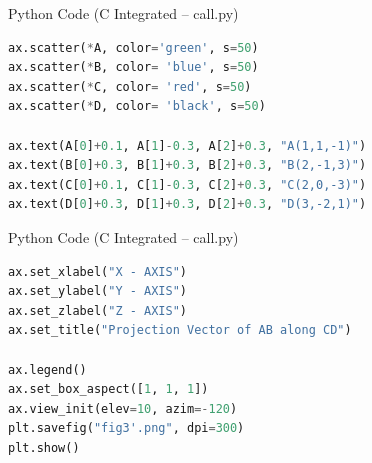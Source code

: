 \documentclass{beamer}
\begin{document}
\begin{frame}[fragile]{Python Code (C Integrated – call.py)
}
\begin{lstlisting}[language=Python]
ax.scatter(*A, color='green', s=50)
ax.scatter(*B, color= 'blue', s=50)
ax.scatter(*C, color= 'red', s=50)
ax.scatter(*D, color= 'black', s=50)

ax.text(A[0]+0.1, A[1]-0.3, A[2]+0.3, "A(1,1,-1)")
ax.text(B[0]+0.3, B[1]+0.3, B[2]+0.3, "B(2,-1,3)")
ax.text(C[0]+0.1, C[1]-0.3, C[2]+0.3, "C(2,0,-3)")
ax.text(D[0]+0.3, D[1]+0.3, D[2]+0.3, "D(3,-2,1)")
\end{lstlisting}
\end{frame}

\begin{frame}[fragile]{Python Code (C Integrated – call.py)
}
\begin{lstlisting}[language=Python]
ax.set_xlabel("X - AXIS")
ax.set_ylabel("Y - AXIS")
ax.set_zlabel("Z - AXIS")
ax.set_title("Projection Vector of AB along CD")

ax.legend()
ax.set_box_aspect([1, 1, 1])  
ax.view_init(elev=10, azim=-120)
plt.savefig("fig3'.png", dpi=300)
plt.show()
\end{lstlisting}
\end{frame}
\end{document}
